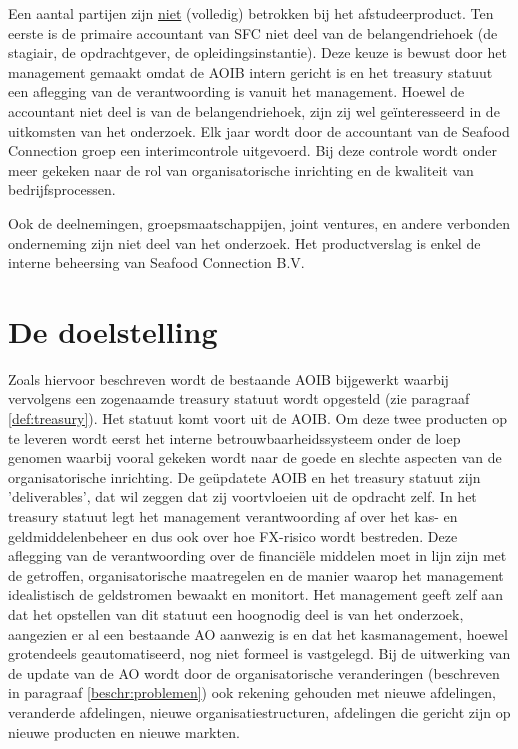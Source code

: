 \documentclass[10pt,a4paper,twoside]{report}
\begin{document}
Een aantal partijen zijn \underline{niet} (volledig) betrokken bij het afstudeerproduct. Ten eerste is de primaire accountant van SFC niet deel van de belangendriehoek (de stagiair, de opdrachtgever, de opleidingsinstantie). Deze keuze is bewust door het management gemaakt omdat de AOIB intern gericht is en het treasury statuut een aflegging van de verantwoording is vanuit het management. Hoewel de accountant niet deel is van de belangendriehoek, zijn zij wel geïnteresseerd in de uitkomsten van het onderzoek. Elk jaar wordt door de accountant van de Seafood Connection groep een interimcontrole uitgevoerd. Bij deze controle wordt onder meer gekeken naar de rol van organisatorische inrichting en de kwaliteit van bedrijfsprocessen. \citep{jaarrapport2017}

Ook de deelnemingen, groepsmaatschappijen, joint ventures, en andere verbonden onderneming zijn niet deel van het onderzoek. Het productverslag is enkel de interne beheersing van Seafood Connection B.V.

\newpage
    \section{De doelstelling}
Zoals hiervoor beschreven wordt de bestaande AOIB bijgewerkt waarbij vervolgens een zogenaamde treasury statuut wordt opgesteld (zie paragraaf \ref{def:treasury}). Het statuut komt voort uit de AOIB. 
Om deze twee producten op te leveren wordt eerst het interne betrouwbaarheidssysteem onder de loep genomen waarbij vooral gekeken wordt naar de goede en slechte aspecten van de organisatorische inrichting. De geüpdatete AOIB en het treasury statuut zijn 'deliverables', dat wil zeggen dat zij voortvloeien uit de opdracht zelf. In het treasury statuut legt het management verantwoording af over het kas- en geldmiddelenbeheer en dus ook over hoe FX-risico wordt bestreden. Deze aflegging van de verantwoording over de financiële middelen moet in lijn zijn met de getroffen, organisatorische maatregelen en de manier waarop het management idealistisch de geldstromen bewaakt en monitort. Het management geeft zelf aan dat het opstellen van dit statuut een hoognodig deel is van het onderzoek, aangezien er al een bestaande AO aanwezig is en dat het kasmanagement, hoewel grotendeels geautomatiseerd, nog niet formeel is vastgelegd. Bij de uitwerking van de update van de AO wordt door de organisatorische veranderingen (beschreven in paragraaf \ref{beschr:problemen}) ook rekening gehouden met nieuwe afdelingen, veranderde afdelingen, nieuwe organisatiestructuren, afdelingen die gericht zijn op nieuwe producten en nieuwe markten.
\end{document}
